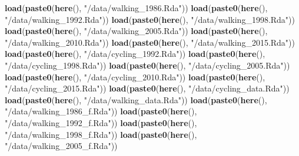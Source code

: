 \documentclass[
11pt, %
oneside, %
english, %
singlespacing, %
]{macthesis} %
\newenvironment{Shaded}{\begin{snugshade}}{\end{snugshade}}
\newcommand{\FunctionTok}[1]{\textcolor[rgb]{0.13,0.29,0.53}{\textbf{#1}}}
\newcommand{\NormalTok}[1]{#1}
\newcommand{\StringTok}[1]{\textcolor[rgb]{0.31,0.60,0.02}{#1}}
\begin{document}
\begin{Shaded}
\begin{Highlighting}[]
\FunctionTok{load}\NormalTok{(}\FunctionTok{paste0}\NormalTok{(}\FunctionTok{here}\NormalTok{(), }\StringTok{"/data/walking\_1986.Rda"}\NormalTok{))}
\FunctionTok{load}\NormalTok{(}\FunctionTok{paste0}\NormalTok{(}\FunctionTok{here}\NormalTok{(), }\StringTok{"/data/walking\_1992.Rda"}\NormalTok{))}
\FunctionTok{load}\NormalTok{(}\FunctionTok{paste0}\NormalTok{(}\FunctionTok{here}\NormalTok{(), }\StringTok{"/data/walking\_1998.Rda"}\NormalTok{))}
\FunctionTok{load}\NormalTok{(}\FunctionTok{paste0}\NormalTok{(}\FunctionTok{here}\NormalTok{(), }\StringTok{"/data/walking\_2005.Rda"}\NormalTok{))}
\FunctionTok{load}\NormalTok{(}\FunctionTok{paste0}\NormalTok{(}\FunctionTok{here}\NormalTok{(), }\StringTok{"/data/walking\_2010.Rda"}\NormalTok{))}
\FunctionTok{load}\NormalTok{(}\FunctionTok{paste0}\NormalTok{(}\FunctionTok{here}\NormalTok{(), }\StringTok{"/data/walking\_2015.Rda"}\NormalTok{))}
\FunctionTok{load}\NormalTok{(}\FunctionTok{paste0}\NormalTok{(}\FunctionTok{here}\NormalTok{(), }\StringTok{"/data/cycling\_1992.Rda"}\NormalTok{))}
\FunctionTok{load}\NormalTok{(}\FunctionTok{paste0}\NormalTok{(}\FunctionTok{here}\NormalTok{(), }\StringTok{"/data/cycling\_1998.Rda"}\NormalTok{))}
\FunctionTok{load}\NormalTok{(}\FunctionTok{paste0}\NormalTok{(}\FunctionTok{here}\NormalTok{(), }\StringTok{"/data/cycling\_2005.Rda"}\NormalTok{))}
\FunctionTok{load}\NormalTok{(}\FunctionTok{paste0}\NormalTok{(}\FunctionTok{here}\NormalTok{(), }\StringTok{"/data/cycling\_2010.Rda"}\NormalTok{))}
\FunctionTok{load}\NormalTok{(}\FunctionTok{paste0}\NormalTok{(}\FunctionTok{here}\NormalTok{(), }\StringTok{"/data/cycling\_2015.Rda"}\NormalTok{))}
\FunctionTok{load}\NormalTok{(}\FunctionTok{paste0}\NormalTok{(}\FunctionTok{here}\NormalTok{(), }\StringTok{"/data/cycling\_data.Rda"}\NormalTok{))}
\FunctionTok{load}\NormalTok{(}\FunctionTok{paste0}\NormalTok{(}\FunctionTok{here}\NormalTok{(), }\StringTok{"/data/walking\_data.Rda"}\NormalTok{))}
\FunctionTok{load}\NormalTok{(}\FunctionTok{paste0}\NormalTok{(}\FunctionTok{here}\NormalTok{(), }\StringTok{"/data/walking\_1986\_f.Rda"}\NormalTok{))}
\FunctionTok{load}\NormalTok{(}\FunctionTok{paste0}\NormalTok{(}\FunctionTok{here}\NormalTok{(), }\StringTok{"/data/walking\_1992\_f.Rda"}\NormalTok{))}
\FunctionTok{load}\NormalTok{(}\FunctionTok{paste0}\NormalTok{(}\FunctionTok{here}\NormalTok{(), }\StringTok{"/data/walking\_1998\_f.Rda"}\NormalTok{))}
\FunctionTok{load}\NormalTok{(}\FunctionTok{paste0}\NormalTok{(}\FunctionTok{here}\NormalTok{(), }\StringTok{"/data/walking\_2005\_f.Rda"}\NormalTok{))}

\end{Highlighting}
\end{Shaded}
\end{document}
